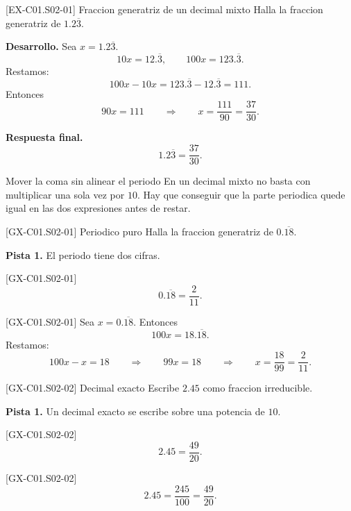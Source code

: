 \begin{solvedexample}{[EX-C01.S02-01] Fraccion generatriz de un decimal mixto}
Halla la fraccion generatriz de \(1.2\overline{3}\).

\textbf{Desarrollo.} Sea \(x=1.2\overline{3}\).
\[
10x=12.\overline{3},
\qquad
100x=123.\overline{3}.
\]
Restamos:
\[
100x-10x=123.\overline{3}-12.\overline{3}=111.
\]
Entonces
\[
90x=111
\qquad\Longrightarrow\qquad
x=\frac{111}{90}=\frac{37}{30}.
\]

\textbf{Respuesta final.}
\[
1.2\overline{3}=\frac{37}{30}.
\]
\end{solvedexample}

\begin{commonerror}{Mover la coma sin alinear el periodo}
En un decimal mixto no basta con multiplicar una sola vez por \(10\). Hay que conseguir que la
parte periodica quede igual en las dos expresiones antes de restar.
\end{commonerror}

\begin{guidedexercise}{[GX-C01.S02-01] Periodico puro}
Halla la fraccion generatriz de \(0.\overline{18}\).

\textbf{Pista 1.} El periodo tiene dos cifras.
\end{guidedexercise}

\begin{shortanswer}{[GX-C01.S02-01]}
\[
0.\overline{18}=\frac{2}{11}.
\]
\end{shortanswer}

\begin{fullsolution}{[GX-C01.S02-01]}
Sea \(x=0.\overline{18}\). Entonces
\[
100x=18.\overline{18}.
\]
Restamos:
\[
100x-x=18
\qquad\Longrightarrow\qquad
99x=18
\qquad\Longrightarrow\qquad
x=\frac{18}{99}=\frac{2}{11}.
\]
\end{fullsolution}

\begin{guidedexercise}{[GX-C01.S02-02] Decimal exacto}
Escribe \(2.45\) como fraccion irreducible.

\textbf{Pista 1.} Un decimal exacto se escribe sobre una potencia de \(10\).
\end{guidedexercise}

\begin{shortanswer}{[GX-C01.S02-02]}
\[
2.45=\frac{49}{20}.
\]
\end{shortanswer}

\begin{fullsolution}{[GX-C01.S02-02]}
\[
2.45=\frac{245}{100}=\frac{49}{20}.
\]
\end{fullsolution}

